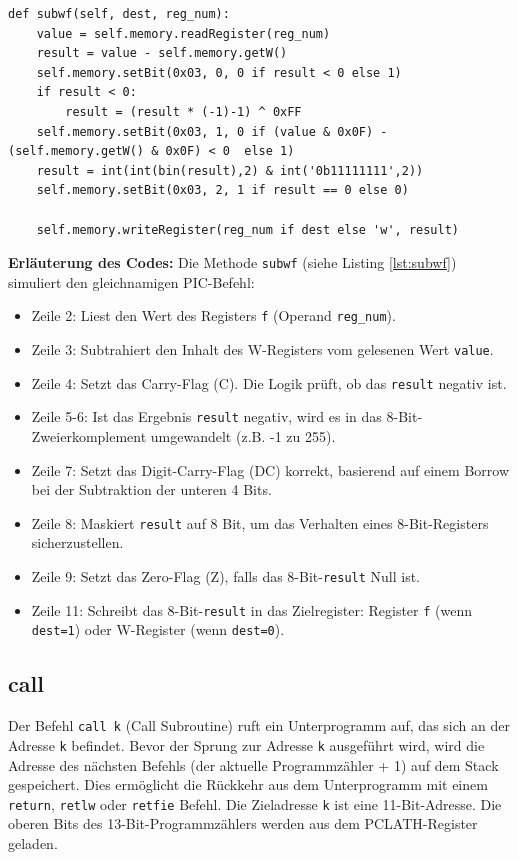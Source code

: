 \begin{lstlisting}[caption={Methode subwf aus dem \ac{ALU} Modul}, label={lst:subwf}]
def subwf(self, dest, reg_num):
    value = self.memory.readRegister(reg_num)
    result = value - self.memory.getW()
    self.memory.setBit(0x03, 0, 0 if result < 0 else 1)
    if result < 0:
        result = (result * (-1)-1) ^ 0xFF
    self.memory.setBit(0x03, 1, 0 if (value & 0x0F) - (self.memory.getW() & 0x0F) < 0  else 1)
    result = int(int(bin(result),2) & int('0b11111111',2))
    self.memory.setBit(0x03, 2, 1 if result == 0 else 0)

    self.memory.writeRegister(reg_num if dest else 'w', result)
\end{lstlisting}
\textbf{Erläuterung des Codes:}
Die Methode \texttt{subwf} (siehe Listing \ref{lst:subwf}) simuliert den gleichnamigen PIC-Befehl:
\begin{itemize}
    \item Zeile 2: Liest den Wert des Registers \texttt{f} (Operand \texttt{reg\_num}).
    \item Zeile 3: Subtrahiert den Inhalt des W-Registers vom gelesenen Wert \texttt{value}.
    \item Zeile 4: Setzt das Carry-Flag (C). Die Logik prüft, ob das \texttt{result} negativ ist. 
    \item Zeile 5-6: Ist das Ergebnis \texttt{result} negativ, wird es in das 8-Bit-Zweierkomplement umgewandelt (z.B. -1 zu 255).
    \item Zeile 7: Setzt das Digit-Carry-Flag (DC) korrekt, basierend auf einem Borrow bei der Subtraktion der unteren 4 Bits.
    \item Zeile 8: Maskiert \texttt{result} auf 8 Bit, um das Verhalten eines 8-Bit-Registers sicherzustellen.
    \item Zeile 9: Setzt das Zero-Flag (Z), falls das 8-Bit-\texttt{result} Null ist.
    \item Zeile 11: Schreibt das 8-Bit-\texttt{result} in das Zielregister: Register \texttt{f} (wenn \texttt{dest=1}) oder W-Register (wenn \texttt{dest=0}).
\end{itemize}

\subsection{call}
Der Befehl \texttt{call k} (Call Subroutine) ruft ein Unterprogramm auf, das sich an der Adresse \texttt{k} befindet. Bevor der Sprung zur Adresse \texttt{k} ausgeführt wird, wird die Adresse des nächsten Befehls (der aktuelle Programmzähler + 1) auf dem Stack gespeichert. Dies ermöglicht die Rückkehr aus dem Unterprogramm mit einem \texttt{return}, \texttt{retlw} oder \texttt{retfie} Befehl. Die Zieladresse \texttt{k} ist eine 11-Bit-Adresse. Die oberen Bits des 13-Bit-Programmzählers werden aus dem PCLATH-Register geladen.

